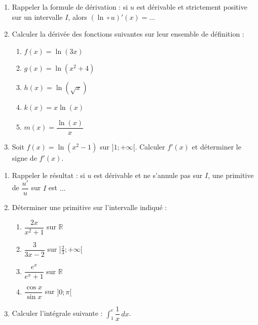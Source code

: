 \documentclass[11pt]{article}
\begin{document}
\begin{exercice}
\begin{enumerate}
    \item Rappeler la formule de dérivation : si $u$ est dérivable et strictement positive sur un intervalle $I$, alors $(\ln \circ u)'(x) = \dots$
    \item Calculer la dérivée des fonctions suivantes sur leur ensemble de définition :
    \begin{enumerate}
        \item $f(x) = \ln(3x)$
        \item $g(x) = \ln(x^2+4)$
        \item $h(x) = \ln(\sqrt{x})$
        \item $k(x) = x\ln(x)$
        \item $m(x) = \dfrac{\ln(x)}{x}$
    \end{enumerate}
    \item Soit $f(x) = \ln(x^2-1)$ sur $]1; +\infty[$. Calculer $f'(x)$ et déterminer le signe de $f'(x)$.
\end{enumerate}
\end{exercice}

\begin{exercice}
\begin{enumerate}
    \item Rappeler le résultat : si $u$ est dérivable et ne s'annule pas sur $I$, une primitive de $\dfrac{u'}{u}$ sur $I$ est $\dots$
    \item Déterminer une primitive sur l'intervalle indiqué :
    \begin{enumerate}
        \item $\dfrac{2x}{x^2+1}$ sur $\mathbb{R}$
        \item $\dfrac{3}{3x-2}$ sur $]\frac{2}{3}; +\infty[$
        \item $\dfrac{e^x}{e^x+1}$ sur $\mathbb{R}$
        \item $\dfrac{\cos x}{\sin x}$ sur $]0; \pi[$
    \end{enumerate}
    \item Calculer l'intégrale suivante : $\displaystyle\int_1^e \dfrac{1}{x} \, dx$.
\end{enumerate}
\end{exercice}
\end{document}
